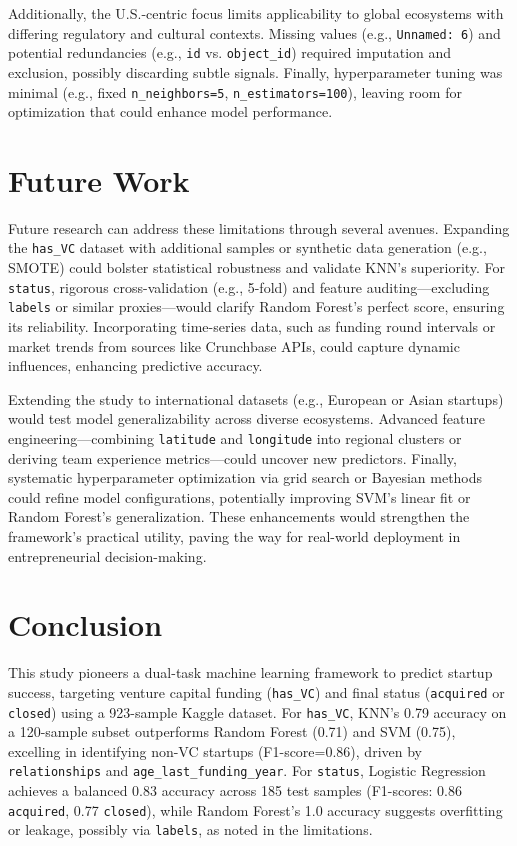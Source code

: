 \documentclass[conference]{IEEEtran}
\begin{document}
    Additionally, the U.S.-centric focus limits applicability to global ecosystems with differing regulatory and cultural contexts. Missing values (e.g., \texttt{Unnamed: 6}) and potential redundancies (e.g., \texttt{id} vs. \texttt{object\_id}) required imputation and exclusion, possibly discarding subtle signals. Finally, hyperparameter tuning was minimal (e.g., fixed \texttt{n\_neighbors=5}, \texttt{n\_estimators=100}), leaving room for optimization that could enhance model performance.


\section{Future Work}
    Future research can address these limitations through several avenues. Expanding the \texttt{has\_VC} dataset with additional samples or synthetic data generation (e.g., SMOTE) could bolster statistical robustness and validate KNN’s superiority. For \texttt{status}, rigorous cross-validation (e.g., 5-fold) and feature auditing—excluding \texttt{labels} or similar proxies—would clarify Random Forest’s perfect score, ensuring its reliability. Incorporating time-series data, such as funding round intervals or market trends from sources like Crunchbase APIs, could capture dynamic influences, enhancing predictive accuracy.

    Extending the study to international datasets (e.g., European or Asian startups) would test model generalizability across diverse ecosystems. Advanced feature engineering—combining \texttt{latitude} and \texttt{longitude} into regional clusters or deriving team experience metrics—could uncover new predictors. Finally, systematic hyperparameter optimization via grid search or Bayesian methods could refine model configurations, potentially improving SVM’s linear fit or Random Forest’s generalization. These enhancements would strengthen the framework’s practical utility, paving the way for real-world deployment in entrepreneurial decision-making.


\section{Conclusion}
    This study pioneers a dual-task machine learning framework to predict startup success, targeting venture capital funding (\texttt{has\_VC}) and final status (\texttt{acquired} or \texttt{closed}) using a 923-sample Kaggle dataset. For \texttt{has\_VC}, KNN’s 0.79 accuracy on a 120-sample subset outperforms Random Forest (0.71) and SVM (0.75), excelling in identifying non-VC startups (F1-score=0.86), driven by \texttt{relationships} and \texttt{age\_last\_funding\_year}. For \texttt{status}, Logistic Regression achieves a balanced 0.83 accuracy across 185 test samples (F1-scores: 0.86 \texttt{acquired}, 0.77 \texttt{closed}), while Random Forest’s 1.0 accuracy suggests overfitting or leakage, possibly via \texttt{labels}, as noted in the limitations.
\end{document}
